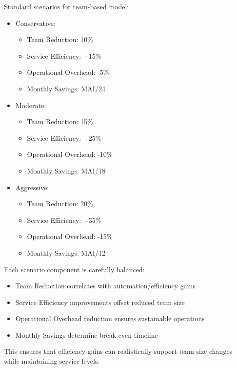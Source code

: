 \documentclass[12pt,a4paper]{article}
\newenvironment{explanation}
{\begin{mdframed}[style=explanationstyle,frametitle={Explanation}]}
{\end{mdframed}}
\newenvironment{observation}
{\begin{mdframed}[style=observationstyle,frametitle={Observation}]}
{\end{mdframed}}
\begin{document}
\begin{observation}
Standard scenarios for team-based model:
\begin{itemize}
    \item Conservative:
        \begin{itemize}
            \item Team Reduction: 10\%
            \item Service Efficiency: +15\%
            \item Operational Overhead: -5\%
            \item Monthly Savings: MAI/24
        \end{itemize}
    \item Moderate:
        \begin{itemize}
            \item Team Reduction: 15\%
            \item Service Efficiency: +25\%
            \item Operational Overhead: -10\%
            \item Monthly Savings: MAI/18
        \end{itemize}
    \item Aggressive:
        \begin{itemize}
            \item Team Reduction: 20\%
            \item Service Efficiency: +35\%
            \item Operational Overhead: -15\%
            \item Monthly Savings: MAI/12
        \end{itemize}
\end{itemize}
\end{observation}

\begin{explanation}
Each scenario component is carefully balanced:
\begin{itemize}
    \item Team Reduction correlates with automation/efficiency gains
    \item Service Efficiency improvements offset reduced team size
    \item Operational Overhead reduction ensures sustainable operations
    \item Monthly Savings determine break-even timeline
\end{itemize}
This ensures that efficiency gains can realistically support team size changes while maintaining service levels.
\end{explanation}
\end{document}
